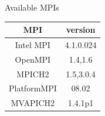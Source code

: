 \documentclass[final,t]{beamer}
\begin{document}
\begin{frame}[fragile]{}
\begin{columns}[t]
\begin{column}{.32\linewidth}
\begin{columns}[t]
\begin{column}{.35\linewidth}
\begin{block}{Available MPIs}
\begin{center}
      \begin{tabular}{|c|c|}
      \hline 
      \textbf{MPI} & \textbf{version} \\ 
      \hline 
      Intel MPI & 4.1.0.024  \\ 
      \hline 
      OpenMPI & 1.4,1.6  \\ 
      \hline 
      MPICH2 & 1.5,3.0.4  \\ 
      \hline 
      PlatformMPI & 08.02  \\ 
      \hline 
      MVAPICH2 & 1.4.1p1  \\ 
      \hline 
      \end{tabular} 
      \end{center}
        \vspace*{-2ex}
      \end{block}
      \end{column}
  \end{columns}


\end{column}
\end{columns}
\end{frame}
\end{document}
